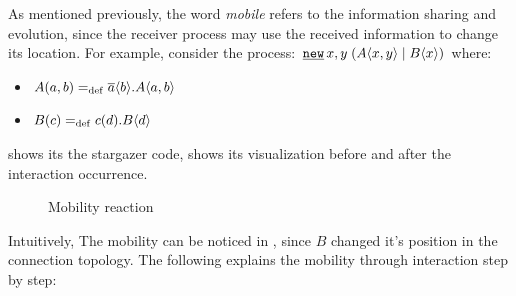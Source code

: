 As mentioned previously, the word \textit{mobile} refers to the information sharing and evolution, since the receiver process may use the received information to change its location. For example, consider the process: $\procres{x,y}{(\procpar{\proccall{A}{x,y}}{\proccall{B}{x}})}$ where:
\begin{itemize}
\item $A(a,b)=_{\mathrm{def}}{}\overline{a}\langle{b}\rangle.A\langle a,b\rangle$
\item $B(c)=_{\mathrm{def}}{}c({d}).B\langle d\rangle$
\end{itemize}


 shows its the stargazer code,   shows its visualization before and after the interaction occurrence.

\raggedbottom
\begin{figure}[H]%
\centering
{}%
\hfill
{}%
\caption{Mobility reaction}
\label{pi_mobility_stargazer_react}%
\end{figure}
Intuitively, The mobility can be noticed in , since $B$ changed it's position in the connection topology.
The following explains the mobility through interaction step by step:
